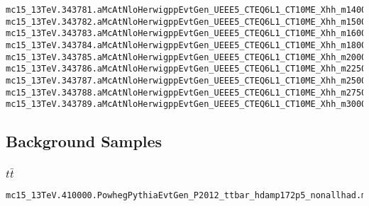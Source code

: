\begin{scriptsize}
\begin{verbatim}
mc15_13TeV.343781.aMcAtNloHerwigppEvtGen_UEEE5_CTEQ6L1_CT10ME_Xhh_m1400_wwbb.merge.DAOD_HIGG5D2.e5153_a766_a821_r7676_p2949
mc15_13TeV.343782.aMcAtNloHerwigppEvtGen_UEEE5_CTEQ6L1_CT10ME_Xhh_m1500_wwbb.merge.DAOD_HIGG5D2.e5153_a766_a821_r7676_p2949
mc15_13TeV.343783.aMcAtNloHerwigppEvtGen_UEEE5_CTEQ6L1_CT10ME_Xhh_m1600_wwbb.merge.DAOD_HIGG5D2.e5153_a766_a821_r7676_p2949
mc15_13TeV.343784.aMcAtNloHerwigppEvtGen_UEEE5_CTEQ6L1_CT10ME_Xhh_m1800_wwbb.merge.DAOD_HIGG5D2.e5153_a766_a821_r7676_p2949
mc15_13TeV.343785.aMcAtNloHerwigppEvtGen_UEEE5_CTEQ6L1_CT10ME_Xhh_m2000_wwbb.merge.DAOD_HIGG5D2.e5153_a766_a821_r7676_p2949
mc15_13TeV.343786.aMcAtNloHerwigppEvtGen_UEEE5_CTEQ6L1_CT10ME_Xhh_m2250_wwbb.merge.DAOD_HIGG5D2.e5153_a766_a821_r7676_p2949
mc15_13TeV.343787.aMcAtNloHerwigppEvtGen_UEEE5_CTEQ6L1_CT10ME_Xhh_m2500_wwbb.merge.DAOD_HIGG5D2.e5153_a766_a821_r7676_p2949
mc15_13TeV.343788.aMcAtNloHerwigppEvtGen_UEEE5_CTEQ6L1_CT10ME_Xhh_m2750_wwbb.merge.DAOD_HIGG5D2.e5153_a766_a821_r7676_p2949
mc15_13TeV.343789.aMcAtNloHerwigppEvtGen_UEEE5_CTEQ6L1_CT10ME_Xhh_m3000_wwbb.merge.DAOD_HIGG5D2.e5153_a766_a821_r7676_p2949
\end{verbatim}

\subsection{Background Samples}
\subsubsection{$t\bar t$}
\fontsize{6}{7} \selectfont%
\begin{verbatim} 
mc15_13TeV.410000.PowhegPythiaEvtGen_P2012_ttbar_hdamp172p5_nonallhad.merge.DAOD_HIGG5D2.e3698_s2608_s2183_r7725_r7676_p2949
\end{verbatim}


\end{scriptsize}
